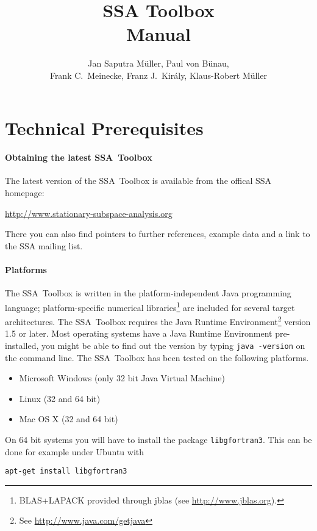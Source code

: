 \documentclass{article}
\newcommand{\1}{\ensuremath{\mathds{1}}}
\newcommand{\0}{\ensuremath{0}}
\begin{document}
\title{SSA Toolbox  \\ Manual}
\author{Jan Saputra M\"uller, Paul von B\"unau, \\ Frank C.~Meinecke, Franz J.~Kir\'{a}ly, Klaus-Robert M\"uller}

\maketitle

\tableofcontents

\newpage

\section{Technical Prerequisites}

\paragraph{Obtaining the latest SSA~Toolbox}

The latest version of the SSA~Toolbox is available from the offical SSA homepage: 
\begin{center}
	\url{http://www.stationary-subspace-analysis.org}
\end{center}
There you can also find pointers to further references, example data and a link 
to the SSA mailing list. 

\paragraph{Platforms}

The SSA~Toolbox is written in the platform-independent Java programming language; 
platform-specific numerical libraries\footnote{BLAS+LAPACK provided through
jblas (see \url{http://www.jblas.org}).} are included for several target architectures. 
The SSA~Toolbox requires the Java Runtime Environment\footnote{See 
\url{http://www.java.com/getjava}} version 1.5 or later. Most operating systems
have a Java Runtime Environment pre-installed, you might be able to find out 
the version by typing \texttt{java -version} on the command line. The SSA~Toolbox has 
been tested on the following platforms.
\begin{itemize}
	\item Microsoft Windows (only 32 bit Java Virtual Machine)
	\item Linux (32 and 64 bit)
	\item Mac OS X (32 and 64 bit)
\end{itemize}
On 64 bit systems you will have to install the package \texttt{libgfortran3}. This can be
done for example under Ubuntu with
\begin{center}
	\texttt{apt-get install libgfortran3}
\end{center}
\end{document}
